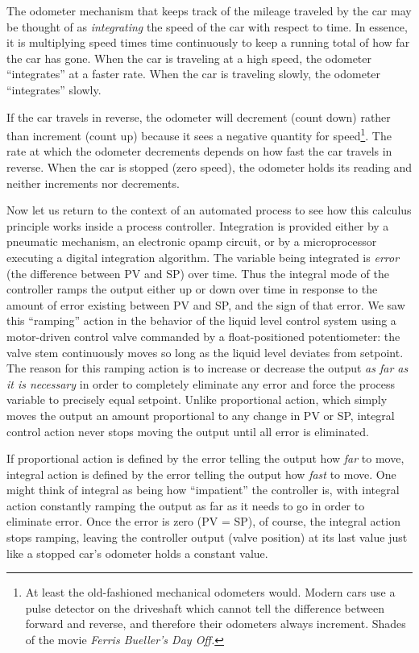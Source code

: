 The odometer mechanism that keeps track of the mileage traveled by the car may be thought of as \textit{integrating} the speed of the car with respect to time.  In essence, it is multiplying speed times time continuously to keep a running total of how far the car has gone.  When the car is traveling at a high speed, the odometer ``integrates'' at a faster rate.  When the car is traveling slowly, the odometer ``integrates'' slowly.
 
If the car travels in reverse, the odometer will decrement (count down) rather than increment (count up) because it sees a negative quantity for speed\footnote{At least the old-fashioned mechanical odometers would.  Modern cars use a pulse detector on the driveshaft which cannot tell the difference between forward and reverse, and therefore their odometers always increment.  Shades of the movie \textit{Ferris Bueller's Day Off.}}.  The rate at which the odometer decrements depends on how fast the car travels in reverse.  When the car is stopped (zero speed), the odometer holds its reading and neither increments nor decrements.

\vskip 10pt

Now let us return to the context of an automated process to see how this calculus principle works inside a process controller.  Integration is provided either by a pneumatic mechanism, an electronic opamp circuit, or by a microprocessor executing a digital integration algorithm.  The variable being integrated is \textit{error} (the difference between PV and SP) over time.  Thus the integral mode of the controller ramps the output either up or down over time in response to the amount of error existing between PV and SP, and the sign of that error.  We saw this ``ramping'' action in the behavior of the liquid level control system using a motor-driven control valve commanded by a float-positioned potentiometer: the valve stem continuously moves so long as the liquid level deviates from setpoint.  The reason for this ramping action is to increase or decrease the output \textit{as far as it is necessary} in order to completely eliminate any error and force the process variable to precisely equal setpoint.  Unlike proportional action, which simply moves the output an amount proportional to any change in PV or SP, integral control action never stops moving the output until all error is eliminated.  

\vskip 10pt

\filbreak

If proportional action is defined by the error telling the output how \textit{far} to move, integral action is defined by the error telling the output how \textit{fast} to move.  One might think of integral as being how ``impatient'' the controller is, with integral action constantly ramping the output as far as it needs to go in order to eliminate error.  Once the error is zero (PV = SP), of course, the integral action stops ramping, leaving the controller output (valve position) at its last value just like a stopped car's odometer holds a constant value. 

